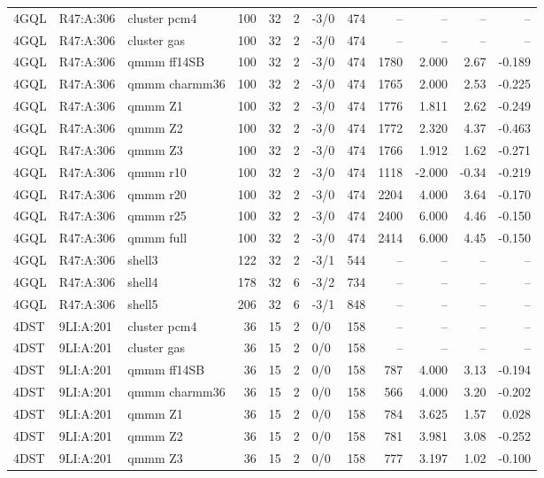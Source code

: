\documentclass[journal=jcisd8,manuscript=suppinfo]{achemso}
\begin{document}
\begin{singlespace}
{\begin{longtable}{lllrrrlrrrrr}
4GQL & R47:A:306 & cluster pcm4 & 100 & 32 & 2 & -3/0 & 474 & -- & -- & -- & --\\
4GQL & R47:A:306 & cluster gas & 100 & 32 & 2 & -3/0 & 474 & -- & -- & -- & --\\
4GQL & R47:A:306 & qmmm ff14SB & 100 & 32 & 2 & -3/0 & 474 & 1780 & 2.000 & 2.67 & -0.189\\
4GQL & R47:A:306 & qmmm charmm36 & 100 & 32 & 2 & -3/0 & 474 & 1765 & 2.000 & 2.53 & -0.225\\
4GQL & R47:A:306 & qmmm Z1 & 100 & 32 & 2 & -3/0 & 474 & 1776 & 1.811 & 2.62 & -0.249\\
4GQL & R47:A:306 & qmmm Z2 & 100 & 32 & 2 & -3/0 & 474 & 1772 & 2.320 & 4.37 & -0.463\\
4GQL & R47:A:306 & qmmm Z3 & 100 & 32 & 2 & -3/0 & 474 & 1766 & 1.912 & 1.62 & -0.271\\
4GQL & R47:A:306 & qmmm r10 & 100 & 32 & 2 & -3/0 & 474 & 1118 & -2.000 & -0.34 & -0.219\\
4GQL & R47:A:306 & qmmm r20 & 100 & 32 & 2 & -3/0 & 474 & 2204 & 4.000 & 3.64 & -0.170\\
4GQL & R47:A:306 & qmmm r25 & 100 & 32 & 2 & -3/0 & 474 & 2400 & 6.000 & 4.46 & -0.150\\
4GQL & R47:A:306 & qmmm full & 100 & 32 & 2 & -3/0 & 474 & 2414 & 6.000 & 4.45 & -0.150\\
4GQL & R47:A:306 & shell3 & 122 & 32 & 2 & -3/1 & 544 & -- & -- & -- & --\\
4GQL & R47:A:306 & shell4 & 178 & 32 & 6 & -3/2 & 734 & -- & -- & -- & --\\
4GQL & R47:A:306 & shell5 & 206 & 32 & 6 & -3/1 & 848 & -- & -- & -- & --\\
4DST & 9LI:A:201 & cluster pcm4 & 36 & 15 & 2 & 0/0 & 158 & -- & -- & -- & --\\
4DST & 9LI:A:201 & cluster gas & 36 & 15 & 2 & 0/0 & 158 & -- & -- & -- & --\\
4DST & 9LI:A:201 & qmmm ff14SB & 36 & 15 & 2 & 0/0 & 158 & 787 & 4.000 & 3.13 & -0.194\\
4DST & 9LI:A:201 & qmmm charmm36 & 36 & 15 & 2 & 0/0 & 158 & 566 & 4.000 & 3.20 & -0.202\\
4DST & 9LI:A:201 & qmmm Z1 & 36 & 15 & 2 & 0/0 & 158 & 784 & 3.625 & 1.57 & 0.028\\
4DST & 9LI:A:201 & qmmm Z2 & 36 & 15 & 2 & 0/0 & 158 & 781 & 3.981 & 3.08 & -0.252\\
4DST & 9LI:A:201 & qmmm Z3 & 36 & 15 & 2 & 0/0 & 158 & 777 & 3.197 & 1.02 & -0.100\\

\end{longtable}}
\end{singlespace}
\end{document}
